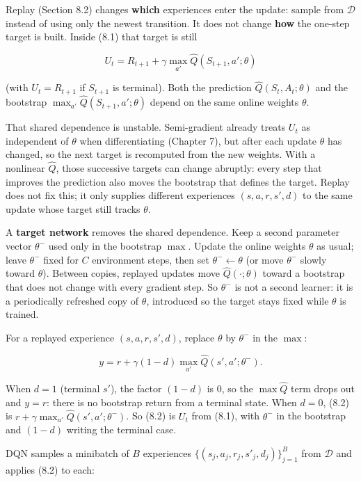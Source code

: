 Replay (Section 8.2) changes \textbf{which} experiences enter the update: sample from $\mathcal{D}$ instead of using only the newest transition. It does not change \textbf{how} the one-step target is built. Inside (8.1) that target is still

\[
U_t
=
R_{t+1}
+
\gamma\max_{a'}\hat{Q}(S_{t+1},a';\theta)
\]

(with $U_t=R_{t+1}$ if $S_{t+1}$ is terminal). Both the prediction $\hat{Q}(S_t,A_t;\theta)$ and the bootstrap $\max_{a'}\hat{Q}(S_{t+1},a';\theta)$ depend on the same online weights $\theta$.

That shared dependence is unstable. Semi-gradient already treats $U_t$ as independent of $\theta$ when differentiating (Chapter 7), but after each update $\theta$ has changed, so the next target is recomputed from the new weights. With a nonlinear $\hat{Q}$, those successive targets can change abruptly: every step that improves the prediction also moves the bootstrap that defines the target. Replay does not fix this; it only supplies different experiences $(s,a,r,s',d)$ to the same update whose target still tracks $\theta$.

A \textbf{target network} removes the shared dependence. Keep a second parameter vector $\theta^-$ used only in the bootstrap $\max$. Update the online weights $\theta$ as usual; leave $\theta^-$ fixed for $C$ environment steps, then set $\theta^-\leftarrow\theta$ (or move $\theta^-$ slowly toward $\theta$). Between copies, replayed updates move $\hat{Q}(\cdot;\theta)$ toward a bootstrap that does not change with every gradient step. So $\theta^-$ is not a second learner: it is a periodically refreshed copy of $\theta$, introduced so the target stays fixed while $\theta$ is trained.

For a replayed experience $(s,a,r,s',d)$, replace $\theta$ by $\theta^-$ in the $\max$:

\begin{equation}
y
=
r
+
\gamma(1-d)\max_{a'}\hat{Q}(s',a';\theta^-).
\tag{8.2}
\end{equation}

When $d=1$ (terminal $s'$), the factor $(1-d)$ is $0$, so the $\max\hat{Q}$ term drops out and $y=r$: there is no bootstrap return from a terminal state. When $d=0$, (8.2) is $r+\gamma\max_{a'}\hat{Q}(s',a';\theta^-)$. So (8.2) is $U_t$ from (8.1), with $\theta^-$ in the bootstrap and $(1-d)$ writing the terminal case.

DQN samples a minibatch of $B$ experiences $\{(s_j,a_j,r_j,s'_j,d_j)\}_{j=1}^{B}$ from $\mathcal{D}$ and applies (8.2) to each:

